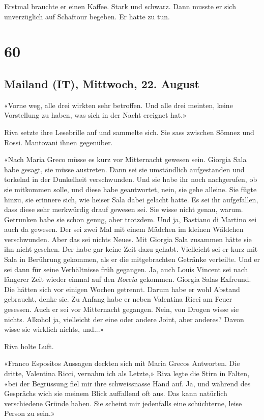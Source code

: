 Erstmal brauchte er einen Kaffee. Stark und schwarz. Dann musste er sich
unverzüglich auf Schaftour begeben. Er hatte zu tun.

\chapter{60}\label{section-60}

\section{Mailand (IT), Mittwoch, 22.
August}\label{mailand-it-mittwoch-22.-august-1}

«Vorne weg, alle drei wirkten sehr betroffen. Und alle drei meinten,
keine Vorstellung zu haben, was sich in der Nacht ereignet hat.»

Riva setzte ihre Lesebrille auf und sammelte sich. Sie sass zwischen
Sömnez und Rossi. Mantovani ihnen gegenüber.

«Nach Maria Greco müsse es kurz vor Mitternacht gewesen sein. Giorgia
Sala habe gesagt, sie müsse austreten. Dann sei sie umständlich
aufgestanden und torkelnd in der Dunkelheit verschwunden. Und sie habe
ihr noch nachgerufen, ob sie mitkommen solle, und diese habe
geantwortet, nein, sie gehe alleine. Sie fügte hinzu, sie erinnere sich,
wie heiser Sala dabei gelacht hatte. Es sei ihr aufgefallen, dass diese
sehr merkwürdig drauf gewesen sei. Sie wisse nicht genau, warum.
Getrunken habe sie schon genug, aber trotzdem. Und ja, Bastiano di
Martino sei auch da gewesen. Der sei zwei Mal mit einem Mädchen im
kleinen Wäldchen verschwunden. Aber das sei nichts Neues. Mit Giorgia
Sala zusammen hätte sie ihn nicht gesehen. Der habe gar keine Zeit dazu
gehabt. Vielleicht sei er kurz mit Sala in Berührung gekommen, als er
die mitgebrachten Getränke verteilte. Und er sei dann für seine
Verhältnisse früh gegangen. Ja, auch Louis Vincent sei nach längerer
Zeit wieder einmal auf den \emph{Roccia} gekommen. Giorgia Salas
Exfreund. Die hätten sich vor einigen Wochen getrennt. Darum habe er
wohl Abstand gebraucht, denke sie. Zu Anfang habe er neben Valentina
Ricci am Feuer gesessen. Auch er sei vor Mitternacht gegangen. Nein, von
Drogen wisse sie nichts. Alkohol ja, vielleicht der eine oder andere
Joint, aber anderes? Davon wisse sie wirklich nichts, und...»

Riva holte Luft.

«Franco Espositos Aussagen deckten sich mit Maria Grecos Antworten. Die
dritte, Valentina Ricci, vernahm ich als Letzte,» Riva legte die Stirn
in Falten, «bei der Begrüssung fiel mir ihre schweissnasse Hand auf. Ja,
und während des Gesprächs wich sie meinem Blick auffallend oft aus. Das
kann natürlich verschiedene Gründe haben. Sie scheint mir jedenfalls
eine schüchterne, leise Person zu sein.»

